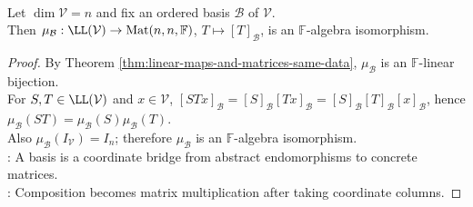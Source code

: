 \begin{proposition} \label{prop:endomorphism-algebra-matrix-algebra-isomorphism} \\
Let $\dim\mathcal{V}=n$ and fix an ordered basis $\mathcal{B}$ of
$\mathcal{V}$.\\
Then $\mu_{\mathcal{B}}:\LL(\mathcal{V})\to\operatorname{Mat}(n,n,\mathbb{F})$, $T\mapsto[T]_{\mathcal{B}}$, is an $\mathbb{F}$-algebra isomorphism.
\begin{proof}
By Theorem \ref{thm:linear-maps-and-matrices-same-data}, $\mu_{\mathcal{B}}$ is an $\mathbb{F}$-linear bijection.\\
For $S,T\in\LL(\mathcal{V})$ and $x\in\mathcal{V}$, $[STx]_{\mathcal{B}}=[S]_{\mathcal{B}}[Tx]_{\mathcal{B}}=[S]_{\mathcal{B}}[T]_{\mathcal{B}}[x]_{\mathcal{B}}$, hence $\mu_{\mathcal{B}}(ST)=\mu_{\mathcal{B}}(S)\mu_{\mathcal{B}}(T)$.\\
Also $\mu_{\mathcal{B}}(I_{\mathcal{V}})=I_n$; therefore $\mu_{\mathcal{B}}$ is an $\mathbb{F}$-algebra isomorphism.\\
: A basis is a coordinate bridge from abstract endomorphisms to concrete matrices.\\
: Composition becomes matrix multiplication after taking coordinate columns.
\end{proof}
\end{proposition}
